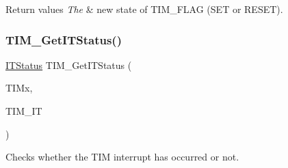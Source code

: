 \begin{DoxyRetVals}{Return values}
{\em The} & new state of T\+I\+M\+\_\+\+F\+L\+AG (S\+ET or R\+E\+S\+ET). \\
\hline
\end{DoxyRetVals}
\mbox{\label{group___t_i_m___private___functions_ga0827a0b411707304f76d33050727c24d}} 
\subsubsection{\texorpdfstring{TIM\_GetITStatus()}{TIM\_GetITStatus()}}
{\footnotesize\ttfamily \mbox{\hyperlink{group___exported__types_gaacbd7ed539db0aacd973a0f6eca34074}{I\+T\+Status}} T\+I\+M\+\_\+\+Get\+I\+T\+Status (\begin{DoxyParamCaption}\item[{\mbox{\hyperlink{struct_t_i_m___type_def}{T\+I\+M\+\_\+\+Type\+Def}} $\ast$}]{T\+I\+Mx,  }\item[{uint16\+\_\+t}]{T\+I\+M\+\_\+\+IT }\end{DoxyParamCaption})}



Checks whether the T\+IM interrupt has occurred or not. 


